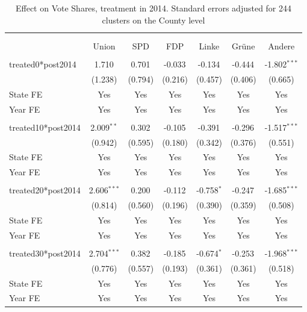 \documentclass[12pt]{article}
\begin{document}
 
\begin{table}[!htbp] \centering
  \caption{Effect on Vote Shares, treatment in 2014. Standard errors adjusted for 244 clusters on the County level}
\begin{tabular}{@{\extracolsep{5pt}}lcccccc}
\\[-1.8ex]\hline
\hline \\[-1.8ex]
\\[-1.8ex] & \multicolumn{1}{c}{Union} & \multicolumn{1}{c}{SPD} & \multicolumn{1}{c}{FDP} & \multicolumn{1}{c}{Linke} & \multicolumn{1}{c}{Grüne} & \multicolumn{1}{c}{Andere}  \\
\hline \\[-1.8ex]
 treated0*post2014 & 1.710$^{}$ & 0.701$^{}$ & -0.033$^{}$ & -0.134$^{}$ & -0.444$^{}$ & -1.802$^{***}$ \\
  & (1.238) & (0.794) & (0.216) & (0.457) & (0.406) & (0.665) \\
 State FE & Yes & Yes & Yes & Yes & Yes & Yes \\
 Year FE & Yes & Yes & Yes & Yes & Yes & Yes \\
\hline \\[-1.8ex]
 treated10*post2014 & 2.009$^{**}$ & 0.302$^{}$ & -0.105$^{}$ & -0.391$^{}$ & -0.296$^{}$ & -1.517$^{***}$ \\
  & (0.942) & (0.595) & (0.180) & (0.342) & (0.376) & (0.551) \\
 State FE & Yes & Yes & Yes & Yes & Yes & Yes \\
 Year FE & Yes & Yes & Yes & Yes & Yes & Yes \\
\hline \\[-1.8ex]
 treated20*post2014 & 2.606$^{***}$ & 0.200$^{}$ & -0.112$^{}$ & -0.758$^{*}$ & -0.247$^{}$ & -1.685$^{***}$ \\
  & (0.814) & (0.560) & (0.196) & (0.390) & (0.359) & (0.508) \\
 State FE & Yes & Yes & Yes & Yes & Yes & Yes \\
 Year FE & Yes & Yes & Yes & Yes & Yes & Yes \\
\hline \\[-1.8ex]
 treated30*post2014 & 2.704$^{***}$ & 0.382$^{}$ & -0.185$^{}$ & -0.674$^{*}$ & -0.253$^{}$ & -1.968$^{***}$ \\
  & (0.776) & (0.557) & (0.193) & (0.361) & (0.361) & (0.518) \\
 State FE & Yes & Yes & Yes & Yes & Yes & Yes \\
 Year FE & Yes & Yes & Yes & Yes & Yes & Yes \\

\end{tabular}
\end{table}
\end{document}
